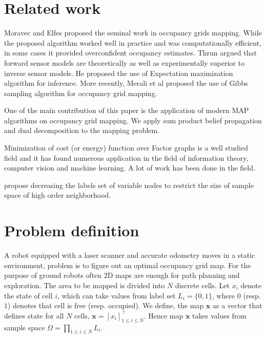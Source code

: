 \documentclass[letterpaper, 10 pt, conference]{ieeeconf} %
\newcommand{\vect}[1]{\mathbf{#1}}
\begin{document}
\section{Related work} %
Moravec and Elfes \cite{elfes1989using,moravec1988sensor,moravec1985high} proposed the
seminal work in occupancy grids mapping. While the proposed algorithm worked
well in practice and was computationally efficient, in some cases it provided
overconfident occupancy estimates. Thrun \cite{thrun2003learning} argued that
forward sensor models are theoretically as well as experimentally superior to 
inverse sensor models. He proposed the use of Expectation maximization
algorithm for inference. More recently, Merali et al \cite{merali2013icra}
proposed the use of Gibbs sampling algorithm for occupancy grid mapping.

One of the main contribution of this paper is the application of modern MAP
algorithms on occupancy grid mapping. We apply sum product belief propagation
and dual decomposition to the mapping problem.

Minimization of cost (or energy) function over Factor graphs is a well studied
field and it has found numerous application in the field of information theory,
computer vision and machine learning. A lot of work has been done in the field.

\cite{leonardis2006efficient}  propose decreasing the labels set of variable
nodes to restrict the size of sample space of high order neighborhood. 

\section{Problem definition}
\newcommand{\map}{\vect{x}}
A robot equipped with a laser scanner and accurate odometry moves in a static
environment, problem is to figure out an optimal occupancy grid map. For the
purpose of ground robots often 2D maps are enough for path planning and
exploration.
The area to be mapped is divided into $N$ discrete cells. Let $x_i$ denote the state of cell $i$, which can take values from label set $L_i = \{0, 1\}$, where $0$ (resp. $1$) denotes that cell is free (resp. occupied). We define, the map $\map$ as a vector that defines state for all $N$ cells, $\map = [x_i]^\top_{1 \le i \le N}$. Hence map $\map$ takes values from sample space $\Omega = \prod_{1 \le i \le N}L_i$.
\end{document}
